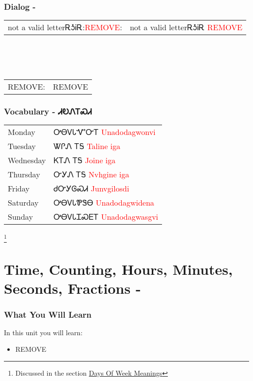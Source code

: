 \subsection{Dialog - }
\begin{tabular}{p{2cm} p{11cm}}
not a valid letterᎡᎼᎥᎡ:\newline \textcolor{red}{REMOVE}: & not a valid letterᎡᎼᎥᎡ 
\newline\textcolor{red}{REMOVE}\\
\end{tabular}
\\
\\
\\
\noindent\begin{tabular}{p{2cm} p{11cm}}REMOVE: & REMOVE\\
\end{tabular}
\subsection{Vocabulary - ᏗᎧᏁᎢᏍᏗ 
}
\begin{tabular}{p{3cm} p{11cm}}
Monday & ᎤᎾᏙᏓᏉᏅᎢ 
 \newline \textcolor{red}{Unadodagwonvi}\\
Tuesday & ᏔᎵᏁ ᎢᎦ 
 \newline \textcolor{red}{Taline iga}\\
Wednesday & ᏦᎢᏁ ᎢᎦ 
 \newline \textcolor{red}{Joine iga}\\
Thursday & ᏅᎩᏁ ᎢᎦ 
 \newline \textcolor{red}{Nvhgine iga}\\
Friday & ᏧᏅᎩᎶᏍᏗ 
 \newline \textcolor{red}{Junvgilosdi}\\
Saturday & ᎤᎾᏙᏓᏈᏕᎾ 
 \newline \textcolor{red}{Unadodagwidena}\\
Sunday & ᎤᎾᏙᏓᏆᏍᎬᎢ 
 \newline \textcolor{red}{Unadodagwasgvi}\\
\end{tabular}

\footnote{Discussed in the section \hyperref[sec:daysOfWeekMeaning]{Days Of Week Meanings}}
\index{}
\chapter{Time, Counting, Hours, Minutes, Seconds, Fractions - }
\subsection{What You Will Learn}
In this unit you will learn:
\begin{itemize}
\item REMOVE
\end{itemize}\newpage

